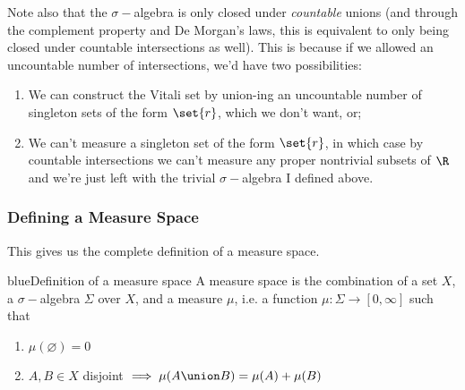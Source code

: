 \documentclass[./analysis.tex]{subfiles}
\begin{document}
    Note also that the $\sigma-$algebra is only closed under \emph{countable} unions (and through the complement property and De Morgan's laws, this is equivalent to only being closed under countable intersections as well). This is because if we allowed an uncountable number of intersections, we'd have two possibilities:

    \begin{enumerate}
        \item We can construct the Vitali set by union-ing an uncountable number of singleton sets of the form $\set{r}$, which we don't want, or;
        \item We can't measure a singleton set of the form $\set{r}$, in which case by countable intersections we can't measure any proper nontrivial subsets of $\R$ and we're just left with the trivial $\sigma-$algebra I defined above.
    \end{enumerate}




    \subsubsection{Defining a Measure Space}
    This gives us the complete definition of a measure space.

    \begin{mycolorbox}{blue}{Definition of a measure space}
        A measure space is the combination of a set $X$, a $\sigma-$algebra $\Sigma$ over $X$, and a measure $\mu$, i.e. a function $\mu: \Sigma \to [0, \infty]$ such that

        \begin{enumerate}
            \item $\mu(\varnothing) = 0$
            \item $A, B \in X$ disjoint $\implies \mu(A \union B) = \mu(A) + \mu(B)$
        \end{enumerate}
    \end{mycolorbox}
\end{document}
